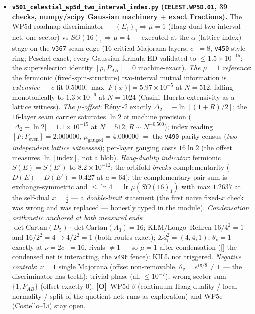 \documentclass[11pt]{article}
\providecommand{\mO}{\textbf{[O]}}\providecommand{\mX}{\textbf{[X]}}
\begin{document}
\begin{itemize}[leftmargin=1.5em]
\item \textbf{\texttt{v501\_celestial\_wp5d\_two\_interval\_index.py} (\texttt{CELEST.WP5D.01}, 39
checks, numpy/scipy Gaussian machinery $+$ exact Fractions).} The WP5d roadmap discriminator ---
$(E_8)_1\Rightarrow\mu{=}1$ (Haag-dual two-interval net, one sector) vs $SO(16)_1\Rightarrow\mu{=}4$
--- executed at the $\alpha$ (lattice-index) stage on the \texttt{v367} seam edge ($16$ critical
Majorana layers, $c_-=8$, \texttt{v450}-style ring; Peschel-exact, every Gaussian formula
ED-validated to $\le1.5\times10^{-15}$; the superselection identity $[\rho,P_{AB}]=0$ machine-exact).
\emph{The $\mu=1$ reference}: the fermionic (fixed-spin-structure) two-interval mutual information is
\emph{extensive} --- $c$ fit $0.5000$, $\max|F(x)|=5.97\times10^{-5}$ at $N{=}512$, falling
monotonically to $1.3\times10^{-6}$ at $N{=}1024$ (Casini--Huerta extensivity as a lattice witness).
\emph{The $\mu$-offset}: R\'enyi-2 exactly $\Delta_2=-\ln[(1{+}R)/2]$; the $16$-layer seam carrier
saturates $\ln2$ at machine precision ($|\Delta_2-\ln2|=1.1\times10^{-15}$ at $N{=}512$; $R\sim
N^{-0.500}$); index reading $[F:F_{\mathrm{even}}]=2.000000$, $\mu_{\mathrm{gauged}}=4.000000$ $=$ the
\texttt{v490} parity census (\emph{two independent lattice witnesses}); per-layer gauging costs
$16\ln2$ (the offset measures $\ln[\text{index}]$, not a blob). \emph{Haag-duality indicator}:
fermionic $S(E)=S(E')$ to $8.2\times10^{-12}$; the orbifold \emph{breaks} complementarity
($D(E)-D(E')=0.427$ at $a{=}64$); the complementary-pair sum is exchange-symmetric and $\le\ln4=
\ln\mu(SO(16)_1)$ with max $1.2637$ at the self-dual $x=\tfrac12$ --- a \emph{double-limit} statement
(the first naive fixed-$x$ check was wrong and was replaced --- honestly typed in the module).
\emph{Condensation arithmetic anchored at both measured ends}: $\det\mathrm{Cartan}(D_5)\cdot\det
\mathrm{Cartan}(A_3)=16$; KLM/Longo--Rehren $16/4^2=1$ and $16/2^2=4\to4/2^2=1$ (both routes exact);
$\Sigma d_i^2=(4,4,1)$; $\theta_v=1$ exactly at $\nu=2c_-=16$, rivals $\neq1$ --- so $\mu=1$ after
condensation ([\mC] the condensed net is interacting, the \texttt{v490} fence): KILL not triggered.
\emph{Negative controls}: $\nu{=}1$ single Majorana (offset non-removable, $\theta_v=e^{i\pi/8}\neq1$
--- the discriminator has teeth); trivial phase (all $\le10^{-7}$); wrong sector sum $\{1,P_{AB}\}$
(offset exactly $0$). \mO\ WP5d-$\beta$ (continuum Haag duality / local normality / split of the
quotient net; runs as exploration) and WP5e (Costello--Li) stay open.

\end{itemize}
\end{document}
